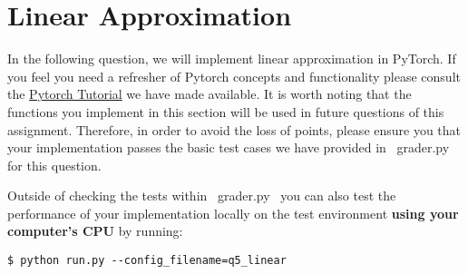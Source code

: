 \section{Linear Approximation}

In the following question, we will implement linear approximation in PyTorch. If you feel you need a refresher of Pytorch concepts and functionality please consult the \href{https://colab.research.google.com/drive/1BZ89PnXpzN2US_OxwuQCazucmuTpuIfS?usp=sharing}{Pytorch Tutorial} we have made available. It is worth noting that the functions you implement in this section will be used in future questions of this assignment. Therefore, in order to avoid the loss of points, please ensure you that your implementation passes the basic test cases we have provided in ~grader.py~ for this question.

Outside of checking the tests within ~grader.py~ you can also test the performance of your implementation locally on the test environment \textbf{using your computer's CPU} by running:

\begin{lstlisting}
$ python run.py --config_filename=q5_linear
\end{lstlisting} 

\begin{enumerate}[(a)]

	

	

	

	

	

	

	

\end{enumerate}